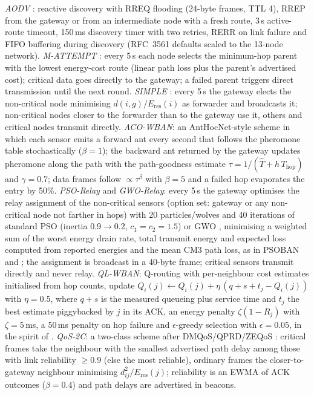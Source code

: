 \emph{AODV} \cite{perkins1999aodv}: reactive discovery with RREQ flooding (24-byte frames, TTL 4), RREP from the gateway or from an intermediate node with a fresh route, 3\,s active-route timeout, 150\,ms discovery timer with two retries, RERR on link failure and FIFO buffering during discovery (RFC~3561 defaults scaled to the 13-node network).
\emph{M-ATTEMPT} \cite{javaid2013mattempt}: every 5\,s each node selects the minimum-hop parent with the lowest energy-cost route (linear path loss plus the parent's advertised cost); critical data goes directly to the gateway; a failed parent triggers direct transmission until the next round.
\emph{SIMPLE} \cite{nadeem2013simple}: every 5\,s the gateway elects the non-critical node minimising $d(i,g)/E_{\mathrm{res}}(i)$ as forwarder and broadcasts it; non-critical nodes closer to the forwarder than to the gateway use it, others and critical nodes transmit directly.
\emph{ACO-WBAN}: an AntHocNet-style scheme \cite{dicaro2005anthocnet} in which each sensor emits a forward ant every second that follows the pheromone table stochastically ($\beta=1$); the backward ant returned by the gateway updates pheromone along the path with the path-goodness estimate $\tau=1/(\hat T+h\,T_{\mathrm{hop}})$ and $\gamma=0.7$; data frames follow $\propto\tau^{\beta}$ with $\beta=5$ and a failed hop evaporates the entry by 50\%.
\emph{PSO-Relay} and \emph{GWO-Relay}: every 5\,s the gateway optimises the relay assignment of the non-critical sensors (option set: gateway or any non-critical node not farther in hops) with 20 particles/wolves and 40 iterations of standard PSO (inertia 0.9$\to$0.2, $c_1=c_2=1.5$) or GWO \cite{mirjalili2014gwo}, minimising a weighted sum of the worst energy drain rate, total transmit energy and expected loss computed from reported energies and the mean CM3 path loss, as in PSOBAN \cite{bilandi2019psoban} and \cite{bilandi2020performance}; the assignment is broadcast in a 40-byte frame; critical sensors transmit directly and never relay.
\emph{QL-WBAN}: Q-routing \cite{boyan1994qrouting} with per-neighbour cost estimates initialised from hop counts, update $Q_{i}(j)\leftarrow Q_{i}(j)+\eta\,(q+s+t_{j}-Q_{i}(j))$ with $\eta=0.5$, where $q+s$ is the measured queueing plus service time and $t_{j}$ the best estimate piggybacked by $j$ in its ACK, an energy penalty $\zeta(1-R_{j})$ with $\zeta=5$\,ms, a 50\,ms penalty on hop failure and $\epsilon$-greedy selection with $\epsilon=0.05$, in the spirit of \cite{guo2022rlfuzzywban,arafat2024rlwban}.
\emph{QoS-2C}: a two-class scheme after DMQoS/QPRD/ZEQoS \cite{razzaque2011dmqos,khan2012qprd,khan2014zeqos}: critical frames take the neighbour with the smallest advertised path delay among those with link reliability $\ge 0.9$ (else the most reliable), ordinary frames the closer-to-gateway neighbour minimising $d_{ij}^{2}/E_{\mathrm{res}}(j)$; reliability is an EWMA of ACK outcomes ($\beta=0.4$) and path delays are advertised in beacons.
